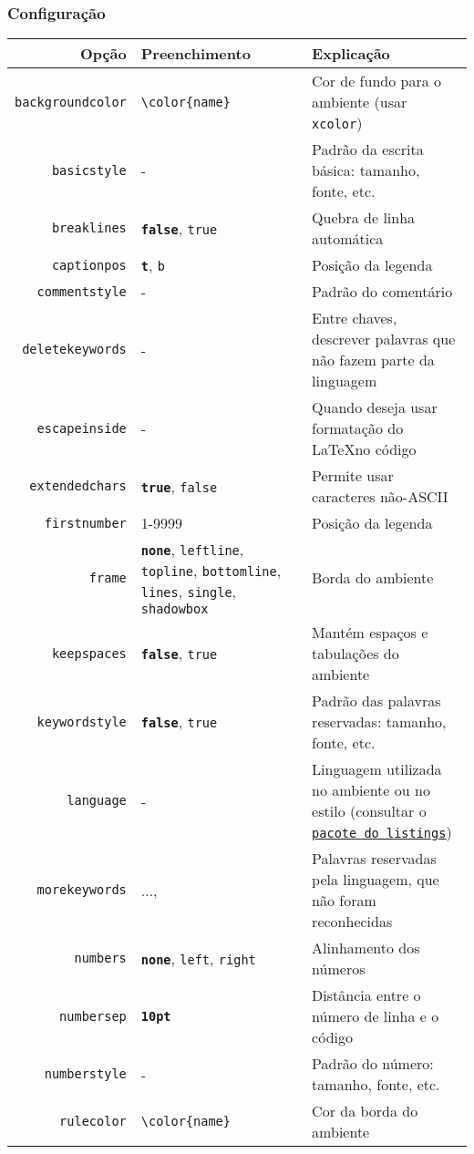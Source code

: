 \documentclass[brazilian]{beamer}
\begin{document}
\begin{frame}[fragile]
    \frametitle{Configuração}
\tiny
    \begin{table}
        \begin{tabular}{rC{2cm}O{6cm}}
            Opção & Preenchimento & Explicação \\ \hline
            \texttt{backgroundcolor} & \lstinline[style=myStyleLatex]!\color{name}! & Cor de fundo para o ambiente (usar \texttt{xcolor}) \\ \hline
            \texttt{basicstyle} & - & Padrão da escrita básica: tamanho, fonte, etc.  \\ \hline
            \texttt{breaklines} & \texttt{\bfseries false}, \texttt{true} & Quebra de linha automática \\ \hline
            \texttt{captionpos} & \texttt{\bfseries t}, \texttt{b} & Posição da legenda \\ \hline
            \texttt{commentstyle} & - & Padrão do comentário \\ \hline 
            \texttt{deletekeywords} & - & Entre chaves, descrever palavras que não fazem parte da linguagem \\ \hline
            \texttt{escapeinside} & - & Quando deseja usar formatação do \LaTeX no código  \\ \hline
            \texttt{extendedchars} & \texttt{\bfseries true}, \texttt{false} & Permite usar caracteres não-ASCII  \\ \hline
            \texttt{firstnumber} & 1-9999 & Posição da legenda \\ \hline
            \texttt{frame} & \texttt{\bfseries none}, \texttt{leftline}, \texttt{topline}, \texttt{bottomline}, \texttt{lines}, \texttt{single}, \texttt{shadowbox}  & Borda do ambiente \\ \hline
            \texttt{keepspaces} & \texttt{\bfseries false}, \texttt{true} & Mantém espaços e tabulações do ambiente \\ \hline
            \texttt{keywordstyle} & \texttt{\bfseries false}, \texttt{true} & Padrão das palavras reservadas: tamanho, fonte, etc.  \\ \hline
            \texttt{language} & - & Linguagem utilizada no ambiente ou no estilo (consultar o \href{https://ctan.dcc.uchile.cl/macros/latex/contrib/listings/listings.pdf}{\texttt{pacote do listings}}) \\ \hline
            \texttt{morekeywords} & {..., } & Palavras reservadas pela linguagem, que não foram reconhecidas \\ \hline
            \texttt{numbers} & \texttt{\bfseries none}, \texttt{left}, \texttt{right} & Alinhamento dos números \\ \hline
            \texttt{numbersep} & \texttt{\bfseries 10pt} & Distância entre o número de linha e o código \\ \hline
            \texttt{numberstyle} & - & Padrão do número: tamanho, fonte, etc. \\ \hline
            \texttt{rulecolor} & \lstinline[style=myStyleLatex]!\color{name}! & Cor da borda do ambiente \\ \hline
        \end{tabular}
    \end{table}


\end{frame}
\end{document}
